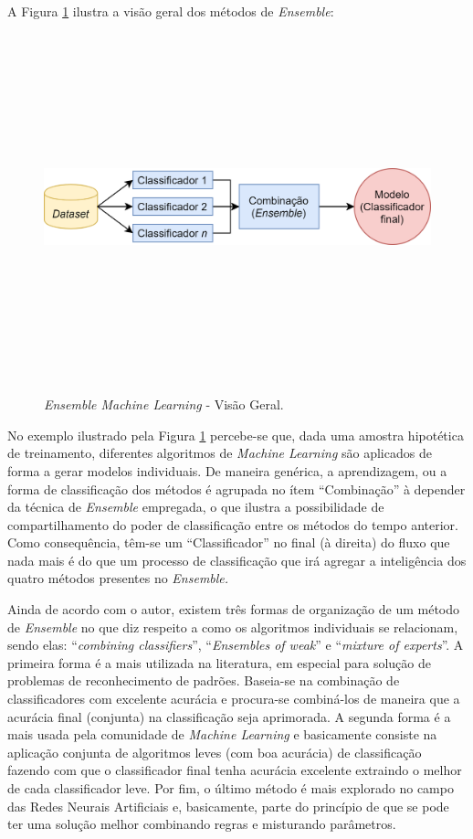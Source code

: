 A Figura \ref{fig:Ensemble} ilustra a visão geral dos métodos de \textit{Ensemble}:

\begin{figure}[H]
\centering
\caption{\textit{Ensemble Machine Learning} - Visão Geral.} \includegraphics[width=13cm,height=10cm,keepaspectratio]{figs/Ensemble_fig.png}
\newline {}\label{fig:Ensemble}
\end{figure}

No exemplo ilustrado pela Figura \ref{fig:Ensemble} percebe-se que, dada uma amostra hipotética de treinamento, diferentes algoritmos de \textit{Machine Learning} são aplicados de forma a gerar modelos individuais. De maneira genérica, a aprendizagem, ou a forma de classificação dos métodos é agrupada no ítem ``Combinação'' à depender da técnica de \textit{Ensemble} empregada, o que ilustra a possibilidade de compartilhamento do poder de classificação entre os métodos do tempo anterior. Como consequência, têm-se um ``Classificador'' no final (à direita) do fluxo que nada mais é do que um processo de classificação que irá agregar a inteligência dos quatro métodos presentes no \textit{Ensemble.}

Ainda de acordo com o autor, existem três formas de organização de um método de \textit{Ensemble} no que diz respeito a como os algoritmos individuais se relacionam, sendo elas: ``\textit{combining classifiers}'', ``\textit{Ensembles of weak}'' e ``\textit{mixture of experts}''. A primeira forma é a mais utilizada na literatura, em especial para solução de problemas de reconhecimento de padrões. Baseia-se na combinação de classificadores com excelente acurácia e procura-se combiná-los de maneira que a acurácia final (conjunta) na classificação seja aprimorada. A segunda forma é a mais usada pela comunidade de \textit{Machine Learning} e basicamente consiste na aplicação conjunta de algoritmos leves (com boa acurácia) de classificação fazendo com que o classificador final tenha acurácia excelente extraindo o melhor de cada classificador leve. Por fim, o último método é mais explorado no campo das Redes Neurais Artificiais e, basicamente, parte do princípio de que se pode ter uma solução melhor combinando regras e misturando parâmetros.

